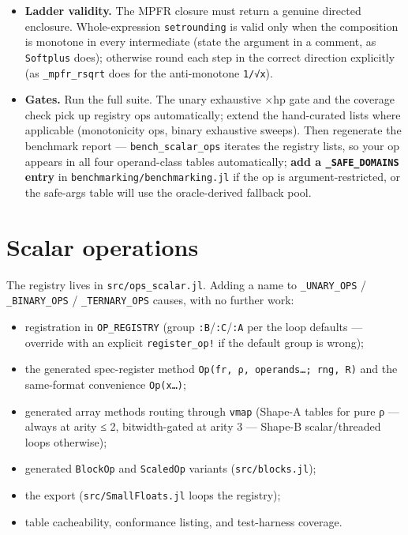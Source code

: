 \begin{itemize}
\item[5. ] \textbf{Ladder validity.} The MPFR closure must return a genuine directed enclosure. Whole-expression \texttt{setrounding} is valid only when the composition is monotone in every intermediate (state the argument in a comment, as \texttt{Softplus} does); otherwise round each step in the correct direction explicitly (as \texttt{\_mpfr\_rsqrt} does for the anti-monotone \texttt{1/√x}).


\item[6. ] \textbf{Gates.} Run the full suite. The unary exhaustive ×hp gate and the coverage check pick up registry ops automatically; extend the hand-curated lists where applicable (monotonicity ops, binary exhaustive sweeps). Then regenerate the benchmark report — \texttt{bench\_scalar\_ops} iterates the registry lists, so your op appears in all four operand-class tables automatically; \textbf{add a \texttt{\_SAFE\_DOMAINS} entry} in \texttt{benchmarking/benchmarking.jl} if the op is argument-restricted, or the safe-args table will use the oracle-derived fallback pool.

\end{itemize}


\section{Scalar operations}



\label{11509067801894334317}{}


The registry lives in \texttt{src/ops\_scalar.jl}. Adding a name to \texttt{\_UNARY\_OPS} / \texttt{\_BINARY\_OPS} / \texttt{\_TERNARY\_OPS} causes, with no further work:



\begin{itemize}
\item registration in \texttt{OP\_REGISTRY} (group \texttt{:B}/\texttt{:C}/\texttt{:A} per the loop defaults — override with an explicit \texttt{register\_op!} if the default group is wrong);


\item the generated spec-register method \texttt{Op(fr, ρ, operands…; rng, R)} and the same-format convenience \texttt{Op(x…)};


\item generated array methods routing through \texttt{vmap} (Shape-A tables for pure ρ — always at arity ≤ 2, bitwidth-gated at arity 3 — Shape-B scalar/threaded loops otherwise);


\item generated \texttt{BlockOp} and \texttt{ScaledOp} variants (\texttt{src/blocks.jl});


\item the export (\texttt{src/SmallFloats.jl} loops the registry);


\item table cacheability, conformance listing, and test-harness coverage.

\end{itemize}


